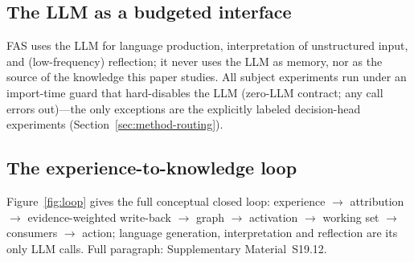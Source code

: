\documentclass[10pt]{article}
\begin{document}
\subsection{The LLM as a budgeted interface}
\label{sec:arch-llm}
FAS uses the LLM for language production, interpretation of unstructured input, and (low-frequency) reflection; it never uses the LLM as memory, nor as the source of the knowledge this paper studies. All subject experiments run under an import-time guard that hard-disables the LLM (zero-LLM contract; any call errors out)---the only exceptions are the explicitly labeled decision-head experiments (Section~\ref{sec:method-routing}).

\subsection{The experience-to-knowledge loop}
\label{sec:arch-loop}
Figure~\ref{fig:loop} gives the full conceptual closed loop: experience $\rightarrow$ attribution $\rightarrow$ evidence-weighted write-back $\rightarrow$ graph $\rightarrow$ activation $\rightarrow$ working set $\rightarrow$ consumers $\rightarrow$ action; language generation, interpretation and reflection are its only LLM calls. Full paragraph: Supplementary Material~S19.12.
\end{document}
